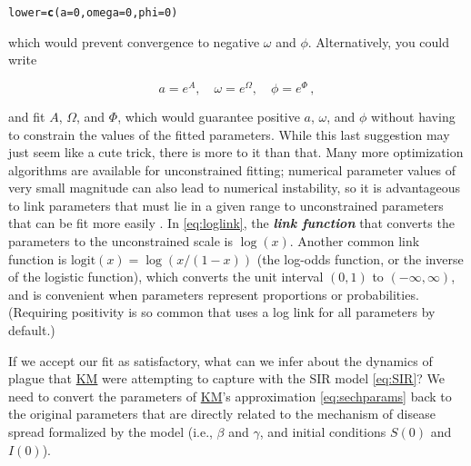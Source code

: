 \documentclass[]{interact}\usepackage[]{graphicx}\usepackage[]{xcolor}
\makeatletter
\newcommand{\hlnum}[1]{\textcolor[rgb]{0.686,0.059,0.569}{#1}}%
\newcommand{\hlstd}[1]{\textcolor[rgb]{0.345,0.345,0.345}{#1}}%
\newcommand{\hlkwb}[1]{\textcolor[rgb]{0.69,0.353,0.396}{#1}}%
\newcommand{\hlkwc}[1]{\textcolor[rgb]{0.333,0.667,0.333}{#1}}%
\newcommand{\hlkwd}[1]{\textcolor[rgb]{0.737,0.353,0.396}{\textbf{#1}}}%
\newenvironment{kframe}{%
 \def\at@end@of@kframe{}%
 \ifinner\ifhmode%
  \def\at@end@of@kframe{\end{minipage}}%
  \begin{minipage}{\columnwidth}%
 \fi\fi%
 \def\FrameCommand##1{\hskip\@totalleftmargin \hskip-\fboxsep
 \colorbox{shadecolor}{##1}\hskip-\fboxsep
     \hskip-\linewidth \hskip-\@totalleftmargin \hskip\columnwidth}%
 \MakeFramed {\advance\hsize-\width
   \@totalleftmargin\z@ \linewidth\hsize
   \@setminipage}}%
 {\par\unskip\endMakeFramed%
 \at@end@of@kframe}
\newenvironment{knitrout}{}{} %
\theoremstyle{plain}%
\theoremstyle{definition}
\theoremstyle{remark}
\newcommand{\term}[1]{{\bfseries\slshape#1}}
\newcommand{\KM}{\protect\hyperlink{cite.KermMcKe27}{KM}\xspace}
\newcommand{\code}[1]{\texttt{\detokenize{#1}}}
\newcommand{\Sinit}{S(0)}
\newcommand{\Iinit}{I(0)}
\makeatother
\begin{document}
\begin{knitrout}
\color{fgcolor}\begin{kframe}
\begin{alltt}
\hlstd{lower} \hlkwb{=} \hlkwd{c}\hlstd{(}\hlkwc{a} \hlstd{=} \hlnum{0}\hlstd{,} \hlkwc{omega} \hlstd{=} \hlnum{0}\hlstd{,} \hlkwc{phi} \hlstd{=} \hlnum{0}\hlstd{)}
\end{alltt}
\end{kframe}
\end{knitrout}

\noindent
which would prevent convergence to negative $\omega$ and $\phi$.
Alternatively, you could write
\begin{linenomath*}
  \begin{equation}\label{eq:loglink}
    a=e^A,\quad \omega=e^\Omega,\quad \phi=e^\Phi \,,
  \end{equation}
\end{linenomath*}
and fit $A$, $\Omega$, and $\Phi$, which would guarantee positive $a$,
$\omega$, and $\phi$ without having to constrain the values of the
fitted parameters.  While this last suggestion may just seem like a
cute trick, there is more to it than that.  Many more optimization
algorithms are available for unconstrained fitting; numerical
parameter values of very small magnitude can also lead to numerical
instability, so it is advantageous to link parameters that must lie in
a given range to unconstrained parameters that can be fit more easily
\citep[pp.\,328--329]{Bolk08}.  In \cref{eq:loglink}, the \term{link
  function} that converts the parameters to the unconstrained scale is
$\log(x)$.  Another common link function is
$\textrm{logit}(x) = \log(x/(1-x))$ (the log-odds function, or the
inverse of the logistic function), which converts the unit interval
$(0,1)$ to $(-\infty,\infty)$, and is convenient when parameters
represent proportions or probabilities.  (Requiring positivity is so
common that \code{fitode} uses a log link for all parameters by
default.)





If we accept our fit as satisfactory, what can we infer about the
dynamics of plague that \KM were attempting to capture with the SIR
model \eqref{eq:SIR}?  We need to convert the parameters of \KM's
approximation \eqref{eq:sechparams} back to the original parameters
that are directly related to the mechanism of disease spread formalized by the model (i.e., $\beta$ and $\gamma$, and initial conditions
$\Sinit$ and $\Iinit$).
\end{document}
